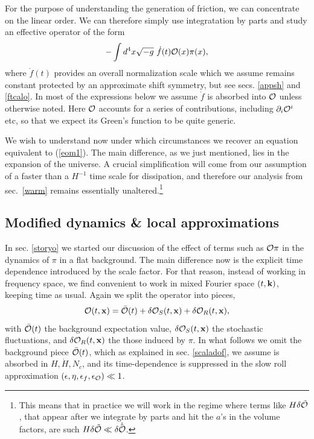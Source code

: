 \documentclass[11pt,amsmath,floats,floatfix,nofootinbib,secnumarabic, superscriptaddress, tightenlines]{revtex4}
\newcommand{\beq}{\begin{equation}}
\newcommand{\eeq}{\end{equation}}
\newcommand{\calo}{{\cal O}}
\begin{document}
{For the purpose of understanding the generation of friction, we can concentrate on the linear order. We can therefore simply use integratation by parts and study an effective operator of the form \beq \label{gencalo} -\int d^4x \sqrt{-g}~\dot f(t)\calo(x)\pi(x),\eeq where $\dot f(t)$ provides an overall normalization scale which we assume remains constant protected by an approximate shift symmetry, but see secs. \ref{appsh} and \ref{ftcalo}. In most of the expressions below we assume $\dot f$ is absorbed into $\calo$ unless otherwise noted. Here $\calo$ accounts for a series of contributions, including $\partial_i{\calo}^i$ etc, so that we expect its Green's function to be quite generic.

We wish to understand now under which circumstances we recover an equation equivalent to (\ref{eom1}). The main difference, as we just mentioned, lies in the expansion of the universe. A crucial simplification will come from our assumption of a faster than a $H^{-1}$ time scale for dissipation, and therefore our analysis from sec.~\ref{warm} remains essentially unaltered.\footnote{This means that in practice we will work in the regime where terms like $H\delta\tilde\calo$, that appear after we integrate by parts and hit the $a$'s in the volume factors, are such $H \delta\tilde\calo \ll \delta\dot{\tilde\calo}$.}

\subsection{Modified dynamics \& local approximations}\label{localapp}

In sec. \ref{storyo} we started our discussion of the effect of terms such as $\calo\pi$ in the dynamics of $\pi$ in a flat background. The main difference now is the explicit time dependence introduced by the scale factor. For that reason, instead of working in frequency space, we find convenient to work in mixed Fourier space $(t,{\bf k})$, keeping time as usual.
Again we split the operator into pieces,
\beq
\label{calotxsr}
\calo (t,{\bf x})= \bar\calo(t)+ \delta\calo_S(t,{\bf x}) + \delta\calo_R (t,{\bf x}),
\eeq
with $ \bar\calo(t)$ the background expectation value, $ \delta\calo_S(t,{\bf x})$ the stochastic fluctuations, and $ \delta\calo_R (t,{\bf x})$ the those induced by $\pi$.
In what follows we omit the background piece $\bar\calo(t)$, which as explained in sec. \ref{scaladof}, we assume is absorbed in $H,\dot H, N_c$, and its time-dependence is  suppressed in the slow roll approximation $(\epsilon, \eta, \epsilon_f, \epsilon_{\calo}) \ll 1$. \\

}
\end{document}
